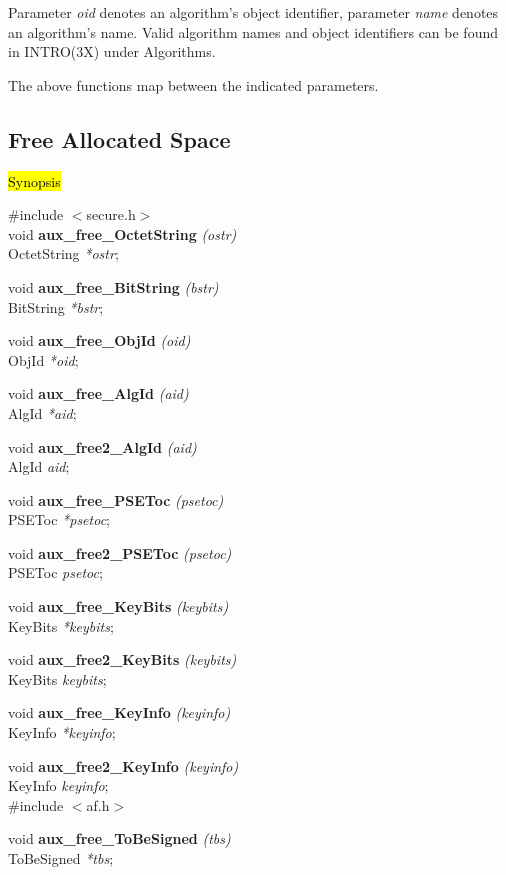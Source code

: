 Parameter {\em oid} denotes an algorithm's object identifier, parameter
{\em name} denotes an algorithm's name. Valid algorithm names and object 
identifiers can be found in INTRO(3X) under Algorithms.

The above functions map between the indicated parameters.

\subsection{Free Allocated Space}
\label{aux_free}
\hl{Synopsis}

\#include $<$secure.h$>$ \\
void {\bf aux\_free\_OctetString} {\em (ostr)} \\
OctetString {\em **ostr};

void {\bf aux\_free\_BitString} {\em (bstr)} \\
BitString {\em **bstr};

void {\bf aux\_free\_ObjId} {\em (oid)} \\
ObjId {\em **oid};

void {\bf aux\_free\_AlgId} {\em (aid)} \\
AlgId {\em **aid};

void {\bf aux\_free2\_AlgId} {\em (aid)} \\
AlgId {\em *aid};

void {\bf aux\_free\_PSEToc} {\em (psetoc)} \\
PSEToc {\em **psetoc};

void {\bf aux\_free2\_PSEToc} {\em (psetoc)} \\
PSEToc {\em *psetoc};

void {\bf aux\_free\_KeyBits} {\em (keybits)} \\
KeyBits {\em **keybits};

void {\bf aux\_free2\_KeyBits} {\em (keybits)} \\
KeyBits {\em *keybits};

void {\bf aux\_free\_KeyInfo} {\em (keyinfo)} \\
KeyInfo {\em **keyinfo};

void {\bf aux\_free2\_KeyInfo} {\em (keyinfo)} \\
KeyInfo {\em *keyinfo};
\\[1em]
\#include $<$af.h$>$ 

void {\bf aux\_free\_ToBeSigned} {\em (tbs)} \\
ToBeSigned {\em **tbs};

